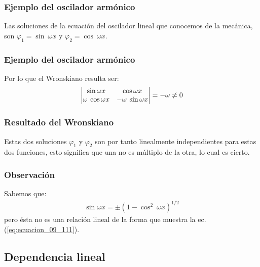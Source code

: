 \documentclass[12pt]{beamer}
\begin{document}
\begin{frame}
\frametitle{Ejemplo del oscilador armónico}
Las soluciones de la ecuación del oscilador lineal que conocemos de la mecánica, son $\varphi_{1} = \sin \: \omega x$ y $\varphi_{2} = \cos \: \omega x$.
\end{frame}
\begin{frame}
\frametitle{Ejemplo del oscilador armónico}
Por lo que el Wronskiano resulta ser:
\pause
\begin{align*}
\mdet{
\sin \omega x & \cos \omega x \\
\omega \: \cos \omega x & - \omega \: \sin \omega x
} = -\omega \neq 0
\end{align*}
\end{frame}
\begin{frame}
\frametitle{Resultado del Wronskiano}
Estas dos soluciones $\varphi_{1}$ y $\varphi_{2}$ son por tanto linealmente independientes para estas dos funciones, esto significa que una no es múltiplo de la otra, lo cual es cierto.
\end{frame}
\begin{frame}
\frametitle{Observación}
Sabemos que:
\pause
\begin{align*}
\sin \omega x = \pm (1 - \cos^{2} \: \omega x)^{1/2}
\end{align*}
pero ésta no es una relación lineal de la forma que muestra la ec. (\ref{eq:ecuacion_09_111}).
\end{frame}

\subsection{Dependencia lineal}
\end{document}
